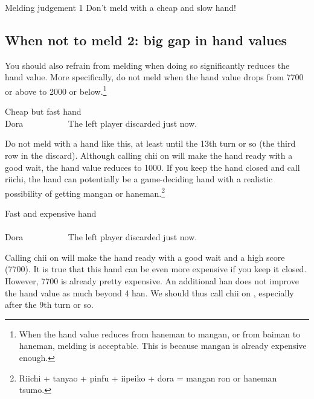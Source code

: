 \bigskip
\color{MyRed}
\begin{itembox}[c]{Melding judgement 1}\normalcolor
Don't meld with a cheap and slow hand!
\end{itembox}\normalcolor

\bigskip
\subsection{When not to meld 2: big gap in hand values}
You should also refrain from melding when doing so significantly reduces the hand value. More specifically, do not meld when the hand value drops from 7700 or above to 2000 or below.\footnote{When the hand value reduces from {\jap haneman} to {\jap mangan}, or from {\jap baiman} to {\jap haneman}, melding is acceptable. This is because {\jap mangan} is already expensive enough.} 

\bigskip
\begin{itembox}[r]{Cheap but fast hand}
\bp
{}~~\\
\hfill\footnotesize{{\jap Dora}~~~~~~~~~~}
\ep
\vspace{-20pt}The left player discarded {\LARGE{}} just now.
\end{itembox}
\noindent
Do not meld with a hand like this, at least until the 13th turn or so (the third row in the discard). Although calling {\jap chii} on {\LARGE{}} will make the hand ready with a good wait, the hand value reduces to 1000. 
If you keep the hand closed and call riichi, the hand can potentially be a game-deciding hand with a realistic possibility of getting {\jap mangan} or {\jap haneman}.\footnote{{\jap Riichi} + {\jap tanyao + pinfu + iipeiko + dora} = {\jap mangan ron} or {\jap haneman tsumo}.} 

\bigskip
\begin{itembox}[r]{Fast and expensive hand}
\bp
{}\\ \vspace{-16pt}
\rfw{}~~\\
\hfill\footnotesize{{\jap Dora}~~~~~~~~~~}
\ep
\vspace{-20pt}The left player discarded {\LARGE{}} just now.
\end{itembox}
\noindent
Calling {\jap chii} on {\LARGE{}} will make the hand ready with a good wait and a high score (7700). It is true that this hand can be even more expensive if you keep it closed. However, 7700 is already pretty expensive. An additional {\jap han} does not improve the hand value as much beyond 4 {\jap han}. We should thus call {\jap chii} on {\LARGE{}}, especially after the 9th turn or so. 


